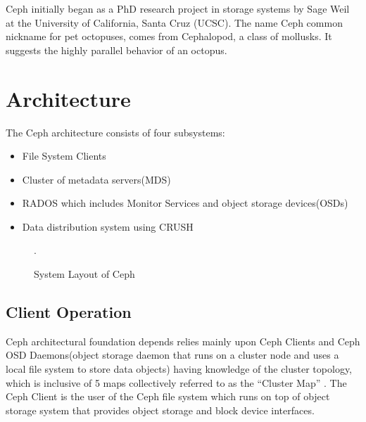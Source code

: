 \documentclass[9pt,twocolumn,twoside]{../../styles/osajnl}
\begin{document}
Ceph initially began as a PhD research project in storage systems by
Sage Weil at the University of California, Santa Cruz (UCSC). The name
Ceph common nickname for pet octopuses, comes from Cephalopod, a class
of mollusks. It suggests the highly parallel behavior of an octopus.

\section{Architecture}

The Ceph architecture consists of four subsystems:
\begin{itemize}
\item File System Clients
\item Cluster of metadata servers(MDS)
\item RADOS which includes Monitor Services and object storage
  devices(OSDs)
\item Data distribution system using CRUSH
\end{itemize}

\begin{figure}[htbp]
\centering
{}
\caption{System Layout of Ceph \cite{paper-Ceph}}.
\label{CSL}
\end{figure}

\subsection{Client Operation} 
Ceph architectural foundation depends relies mainly upon Ceph Clients
and Ceph OSD Daemons(object storage daemon that runs on a cluster node
and uses a local file system to store data objects) having knowledge
of the cluster topology, which is inclusive of 5 maps collectively
referred to as the “Cluster Map” \cite{www-ceph-architecture}. The
Ceph Client is the user of the Ceph file system which runs on top of
object storage system that provides object storage and block device
interfaces.
\end{document}

